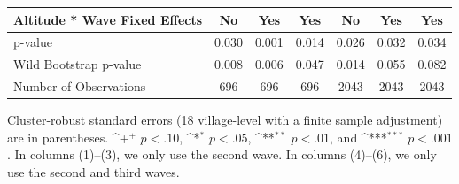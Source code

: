 \documentclass[fleqn,11pt]{article}
\newcommand{\sym}[1]{\rlap{$#1$}}
\def\sym#1{\ifmmode^{#1}\else\(^{#1}\)\fi
}
\begin{document}
\begin{table}[h]
\begin{adjustbox}{max width=\textwidth}
\begin{threeparttable}
\begin{tabular}{l*{6}{c}}
Altitude * Wave Fixed Effects&         No         &         Yes         &         Yes        & No         &         Yes         &         Yes   \\
\hline
         p-value           &       0.030         &       0.001         &       0.014         &       0.026         &       0.032         &       0.034         \\
Wild Bootstrap p-value &       0.008         &       0.006         &       0.047         &       0.014         &       0.055         &       0.082         \\

Number of Observations        &         696         &         696         &         696         &        2043         &        2043         &        2043         \\
\hline\hline
\end{tabular}
\begin{tablenotes}
\item Cluster-robust standard errors (18 village-level with a finite sample adjustment) are in parentheses. \sym{+} \(p<.10\), \sym{*} \(p<.05\), \sym{**} \(p<.01\), and \sym{***} \(p<.001\). In columns (1)--(3), we only use the second wave. In columns (4)--(6), we only use the second and third waves. 

\end{tablenotes}
\end{threeparttable}
\end{adjustbox}
\end{table}
\end{document}
